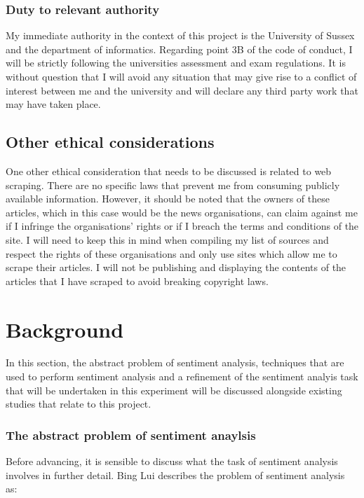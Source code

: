 \documentclass[a4paper,11pt]{report}
\begin{document}
\subsection{Duty to relevant authority}
My immediate authority in the context of this project is the University of Sussex and the department of informatics. Regarding point 3B of the code of conduct, I will be strictly following the universities assessment and exam regulations. It is without question that I will avoid any situation that may give rise to a conflict of interest between me and the university and will declare any third party work that may have taken place.

\section{Other ethical considerations}
One other ethical consideration that needs to be discussed is related to web scraping. There are no specific laws that prevent me from consuming publicly available information. However, it should be noted that the owners of these articles, which in this case would be the news organisations, can claim against me if I infringe the organisations' rights or if I breach the terms and conditions of the site. I will need to keep this in mind when compiling my list of sources and respect the rights of these organisations and only use sites which allow me to scrape their articles. I will not be publishing and displaying the contents of the articles that I have scraped to avoid breaking copyright laws.

\chapter{Background}
\label{chap:background}

In this section, the abstract problem of sentiment analysis, techniques that are used to perform sentiment analysis and a refinement of the sentiment analyis task that will be undertaken in this experiment will be discussed alongside existing studies that relate to this project.

\subsection{The abstract problem of sentiment anaylsis}
Before advancing, it is sensible to discuss what the task of sentiment analysis involves in further detail. Bing Lui describes the problem of sentiment analysis as:
\end{document}
